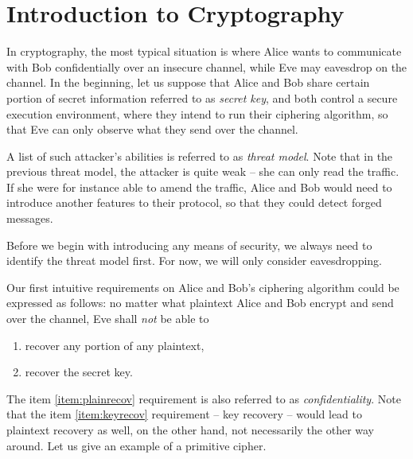 \section{Introduction to Cryptography}
\label{sec:introcrypto}


In cryptography, the most typical situation is where Alice wants to communicate with Bob confidentially over an insecure channel, while Eve may eavesdrop on the channel. In the beginning, let us suppose that Alice and Bob share certain portion of secret information referred to as {\em secret key}, and both control a secure execution environment, where they intend to run their ciphering algorithm, so that Eve can only observe what they send over the channel.

\begin{note}
\label{note:threat}
	A list of such attacker's abilities is referred to as {\em threat model}. Note that in the previous threat model, the attacker is quite weak -- she can only read the traffic. If she were for instance able to amend the traffic, Alice and Bob would need to introduce another features to their protocol, so that they could detect forged messages.
	
	Before we begin with introducing any means of security, we always need to identify the threat model first. For now, we will only consider eavesdropping.
\end{note}

Our first intuitive requirements on Alice and Bob's ciphering algorithm could be expressed as follows: no matter what plaintext Alice and Bob encrypt and send over the channel, Eve shall {\em not} be able to
\begin{enumerate}
	\item recover any portion of any plaintext, \label{item:plainrecov}
	\item recover the secret key. \label{item:keyrecov}
\end{enumerate}
The item \ref{item:plainrecov} requirement is also referred to as {\em confidentiality}. Note that the item \ref{item:keyrecov} requirement -- key recovery -- would lead to plaintext recovery as well, on the other hand, not necessarily the other way around. Let us give an example of a primitive cipher.


